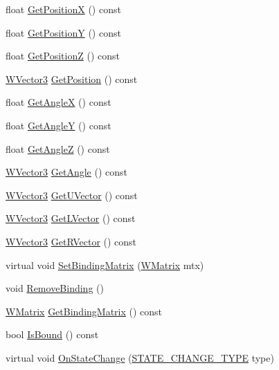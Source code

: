 \begin{DoxyCompactItemize}
\item 
float \hyperlink{class_w_orientation_ae09d7d93bbd88e4347ef4aadea94cb88}{Get\+PositionX} () const 
\item 
float \hyperlink{class_w_orientation_aef8b5b28301ff4b5f92656b7c6e500f5}{Get\+PositionY} () const 
\item 
float \hyperlink{class_w_orientation_a0c6a47acdb267298165c5a60daabac54}{Get\+PositionZ} () const 
\item 
\hyperlink{class_w_vector3}{W\+Vector3} \hyperlink{class_w_orientation_a2739c58a32bb8141bde6636fd31f6eb8}{Get\+Position} () const 
\item 
float \hyperlink{class_w_orientation_a587d26b89ba56a6cb224a5e97cc891c2}{Get\+AngleX} () const 
\item 
float \hyperlink{class_w_orientation_a1cfeabfcaa75ecbf411311af08685723}{Get\+AngleY} () const 
\item 
float \hyperlink{class_w_orientation_ac1311b6bcc36286b0a7318df9e0e6f18}{Get\+AngleZ} () const 
\item 
\hyperlink{class_w_vector3}{W\+Vector3} \hyperlink{class_w_orientation_ae1d3adbbc48f8847fec24044da2372c8}{Get\+Angle} () const 
\item 
\hyperlink{class_w_vector3}{W\+Vector3} \hyperlink{class_w_orientation_ad23f7b1ad75ad5ea25f613763aad0636}{Get\+U\+Vector} () const 
\item 
\hyperlink{class_w_vector3}{W\+Vector3} \hyperlink{class_w_orientation_a7bb1b85ada5a44779d60cded3bf68b39}{Get\+L\+Vector} () const 
\item 
\hyperlink{class_w_vector3}{W\+Vector3} \hyperlink{class_w_orientation_a4ea7f64b238a7962d4aab3b85ab8db8c}{Get\+R\+Vector} () const 
\item 
virtual void \hyperlink{class_w_orientation_a6fa2b52c1a026c084d24ccfa4064162a}{Set\+Binding\+Matrix} (\hyperlink{class_w_matrix}{W\+Matrix} mtx)
\item 
void \hyperlink{class_w_orientation_a1ee756bc440d653a12218b4b90d98ece}{Remove\+Binding} ()
\item 
\hyperlink{class_w_matrix}{W\+Matrix} \hyperlink{class_w_orientation_abe837553506e924f54c7cb3dc75b40f7}{Get\+Binding\+Matrix} () const 
\item 
bool \hyperlink{class_w_orientation_a1f759ccc89e722caa234f56ff15f856e}{Is\+Bound} () const 
\item 
virtual void \hyperlink{class_w_orientation_aa765b7dcd772bbcc511c2c9317e7693c}{On\+State\+Change} (\hyperlink{_w_orientation_8h_afe94de0a48bbd7b343ab18bc318cef28}{S\+T\+A\+T\+E\+\_\+\+C\+H\+A\+N\+G\+E\+\_\+\+T\+Y\+PE} type)
\end{DoxyCompactItemize}


